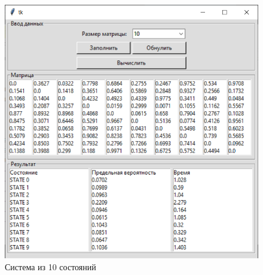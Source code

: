 \documentclass[12pt,a4paper,oneside]{report}
\begin{document}
\begin{figure}[h]
	\centering
	\includegraphics[scale=0.59]{3.png}
	\caption{Система из 10 состояний}
	\label{fig:screenshot004}
	
\end{figure}
\end{document}
